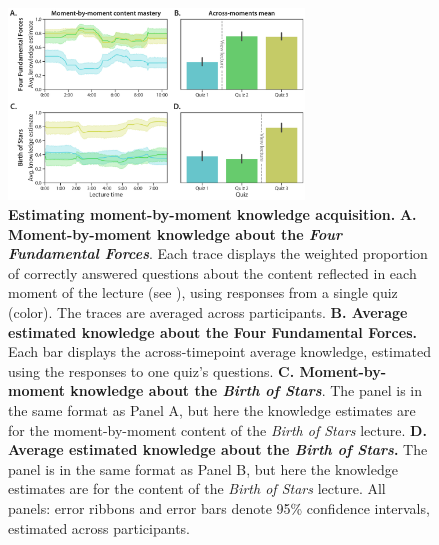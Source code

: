 \documentclass[10pt]{article}
\renewcommand{\nameref}[1]{\mbox{\textit{\oldnameref{#1}}}}
\begin{document}
\begin{figure}[tp]
    \centering
    \includegraphics[width=0.7\textwidth]{figs/content-mastery}

    \caption{\textbf{Estimating moment-by-moment knowledge acquisition.}
    \textbf{A. Moment-by-moment knowledge about the \textit{Four Fundamental
    Forces}}. Each trace displays the weighted proportion of correctly answered
    questions about the content reflected in each moment of the lecture (see
    \nameref{subsec:traces}), using responses from a single
    quiz (color). The traces are averaged across participants. \textbf{B.
    Average estimated knowledge about the \textbf{Four Fundamental Forces}.}
    Each bar displays the across-timepoint average knowledge, estimated using
    the responses to one quiz's questions. \textbf{C. Moment-by-moment
    knowledge about the \textit{Birth of Stars}}. The panel is in the same
    format as Panel A, but here the knowledge estimates are for the
    moment-by-moment content of the \textit{Birth of Stars} lecture. \textbf{D.
    Average estimated knowledge about the \textit{Birth of Stars}.} The panel
    is in the same format as Panel B, but here the knowledge estimates are for
    the content of the \textit{Birth of Stars} lecture. All panels: error
    ribbons and error bars denote 95\% confidence intervals, estimated across
    participants.}

    \label{fig:knowledge-timeseries}
\end{figure}
\end{document}
